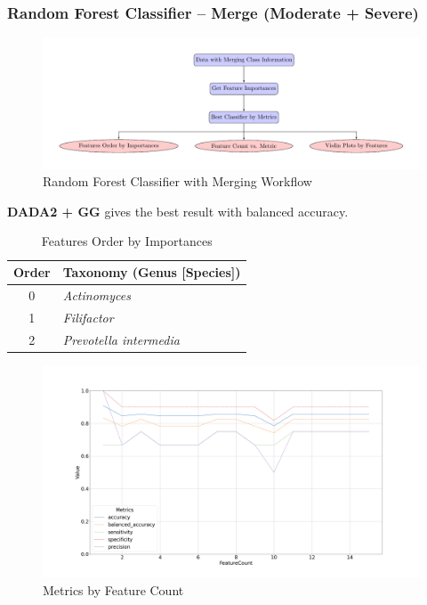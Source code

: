 \documentclass{beamer}
\begin{document}
    \begin{frame}[allowframebreaks]
        \frametitle{Random Forest Classifier -- Merge (Moderate + Severe)}

        \begin{figure}
            \includegraphics[width=0.8 \linewidth]{figures/RandomForest/merge.pdf}
            \caption{Random Forest Classifier with Merging Workflow}
        \end{figure}

        \textbf{DADA2 + GG} gives the best result with balanced accuracy.

        \begin{table}
            \caption{Features Order by Importances}
            \begin{tabular}{c|l}
                Order & Taxonomy (Genus [Species]) \\ \hline
                0 & \textit{Actinomyces} \\
                1 & \textit{Filifactor} \\
                2 & \textit{Prevotella intermedia} \\
            \end{tabular}
        \end{table}

        \begin{figure}
            \includegraphics[width=0.8 \linewidth]{figures/RandomForest/two.DADA2.gg/metrics.png}
            \caption{Metrics by Feature Count}
        \end{figure}


\end{frame}
\end{document}
